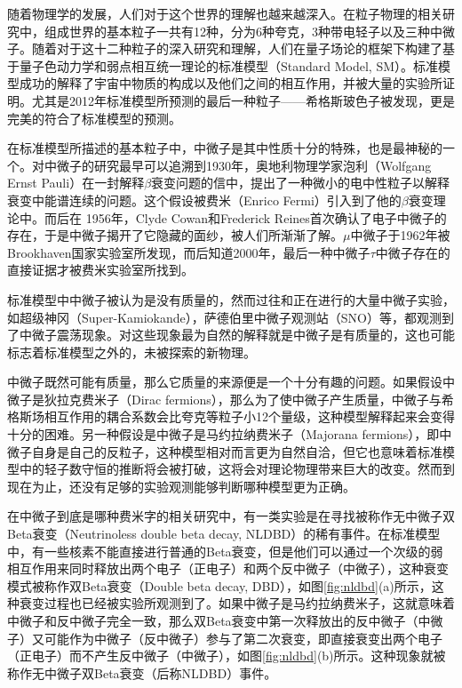 
随着物理学的发展，人们对于这个世界的理解也越来越深入。在粒子物理的相关研究中，组成世界的基本粒子一共有12种，分为6种夸克，3种带电轻子以及三种中微子。随着对于这十二种粒子的深入研究和理解，人们在量子场论的框架下构建了基于量子色动力学和弱点相互统一理论的标准模型（Standard Model, SM）。标准模型成功的解释了宇宙中物质的构成以及他们之间的相互作用，并被大量的实验所证明。尤其是2012年标准模型所预测的最后一种粒子——希格斯玻色子被发现，更是完美的符合了标准模型的预测。

在标准模型所描述的基本粒子中，中微子是其中性质十分的特殊，也是最神秘的一个。对中微子的研究最早可以追溯到1930年，奥地利物理学家泡利（Wolfgang Ernst Pauli）在一封解释$\beta$衰变问题的信中，提出了一种微小的电中性粒子以解释衰变中能谱连续的问题。这个假设被费米（Enrico Fermi）引入到了他的$\beta$衰变理论中\supercite{wilson1968fermi}。而后在
1956年，Clyde Cowan和Frederick Reines首次确认了电子中微子的存在\supercite{cowan1991detection}，于是中微子揭开了它隐藏的面纱，被人们所渐渐了解。$\mu$中微子于1962年被Brookhaven国家实验室所发现\supercite{danby1962observation}，而后知道2000年，最后一种中微子$\tau$中微子存在的直接证据才被费米实验室所找到\supercite{kodama2001observation}。

标准模型中中微子被认为是没有质量的，然而过往和正在进行的大量中微子实验，如超级神冈（Super-Kamiokande）\supercite{fukuda1998evidence}，萨德伯里中微子观测站（SNO）\supercite{ahmad2002direct}等，都观测到了中微子震荡现象。对这些现象最为自然的解释就是中微子是有质量的，这也可能标志着标准模型之外的，未被探索的新物理。

中微子既然可能有质量，那么它质量的来源便是一个十分有趣的问题。如果假设中微子是狄拉克费米子（Dirac fermions），那么为了使中微子产生质量，中微子与希格斯场相互作用的耦合系数会比夸克等粒子小12个量级，这种模型解释起来会变得十分的困难。另一种假设是中微子是马约拉纳费米子（Majorana fermions），即中微子自身是自己的反粒子，这种模型相对而言更为自然自洽，但它也意味着标准模型中的轻子数守恒的推断将会被打破，这将会对理论物理带来巨大的改变。然而到现在为止，还没有足够的实验观测能够判断哪种模型更为正确。

在中微子到底是哪种费米字的相关研究中，有一类实验是在寻找被称作无中微子双Beta衰变（Neutrinoless double beta decay, NLDBD）\supercite{avignone2008double}的稀有事件。在标准模型中，有一些核素不能直接进行普通的Beta衰变，但是他们可以通过一个次级的弱相互作用来同时释放出两个电子（正电子）和两个反中微子（中微子），这种衰变模式被称作双Beta衰变（Double beta decay, DBD），如图\ref{fig:nldbd}(a)所示，这种衰变过程也已经被实验所观测到了。如果中微子是马约拉纳费米子，这就意味着中微子和反中微子完全一致，那么双Beta衰变中第一次释放出的反中微子（中微子）又可能作为中微子（反中微子）参与了第二次衰变，即直接衰变出两个电子（正电子）而不产生反中微子（中微子），如图\ref{fig:nldbd}(b)所示。这种现象就被称作无中微子双Beta衰变（后称NLDBD）事件。

